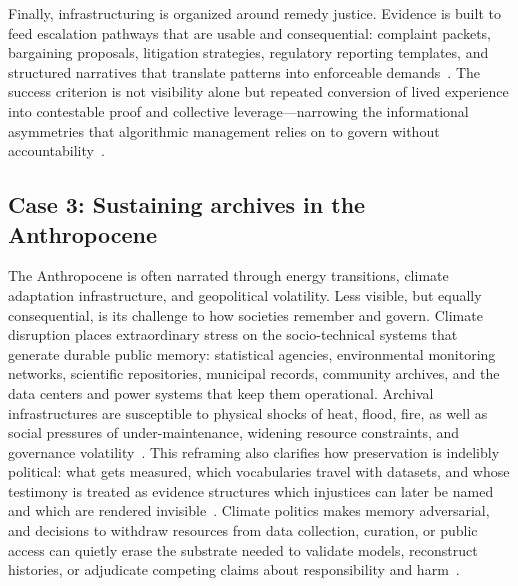 \documentclass[acmsmall,screen]{acmart}
\begin{document}
Finally, infrastructuring is organized around remedy justice. Evidence is built to feed escalation pathways that are usable and consequential: complaint packets, bargaining proposals, litigation strategies, regulatory reporting templates, and structured narratives that translate patterns into enforceable demands~\cite{calacciBargainingBlackBoxDesigning2022,zhangDataProbesBoundary2024}. The success criterion is not visibility alone but repeated conversion of lived experience into contestable proof and collective leverage---narrowing the informational asymmetries that algorithmic management relies on to govern without accountability~\cite{binnsNotEvenNice2025}.

\subsection*{Case 3: Sustaining archives in the Anthropocene}

The Anthropocene is often narrated through energy transitions, climate adaptation infrastructure, and geopolitical volatility. Less visible, but equally consequential, is its challenge to how societies remember and govern. Climate disruption places extraordinary stress on the socio-technical systems that generate durable public memory: statistical agencies, environmental monitoring networks, scientific repositories, municipal records, community archives, and the data centers and power systems that keep them operational. Archival infrastructures are susceptible to physical shocks of heat, flood, fire, as well as social pressures of under-maintenance, widening resource constraints, and governance volatility~\cite{mazurczykAmericanArchivesClimate2018,orrClimateChangeCultural2021,sesanaClimateChangeImpacts2021}. This reframing also clarifies how preservation is indelibly political: what gets measured, which vocabularies travel with datasets, and whose testimony is treated as evidence structures which injustices can later be named and which are rendered invisible~\cite{woodMobilizingRecordsReframing2014,yeoConceptsRecord12007,carbajalCriticalDigitalArchives2021a}. Climate politics makes memory adversarial, and decisions to withdraw resources from data collection, curation, or public access can quietly erase the substrate needed to validate models, reconstruct histories, or adjudicate competing claims about responsibility and harm~\cite{mazurczykAmericanArchivesClimate2018,robinsonComeHellHigh2021}.
\end{document}
